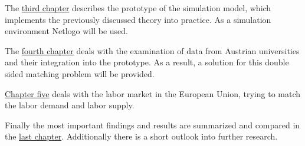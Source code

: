 The \hyperref[prototype]{third chapter} describes the prototype of the simulation model, which implements the previously discussed theory into practice. 
As a simulation environment Netlogo will be used.

The \hyperref[evaluation_students]{fourth chapter} deals with the examination of data from Austrian universities and their integration into the prototype. 
As a result, a solution for this double sided matching problem will be provided.

\hyperref[evaluation_labor]{Chapter five} deals with the labor market in the European Union, trying to match the labor demand and labor supply. 

Finally the most important findings and results are summarized and compared in the \hyperref[summary]{last chapter}.
Additionally there is a short outlook into further research.